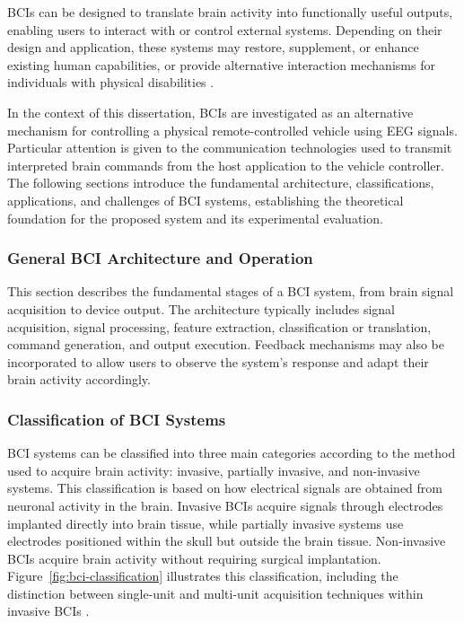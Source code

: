 BCIs can be designed to translate brain activity into functionally useful outputs, enabling users to interact with or control external systems. Depending on their design and application, these systems may restore, supplement, or enhance existing human capabilities, or provide alternative interaction mechanisms for individuals with physical disabilities .

In the context of this dissertation, BCIs are investigated as an alternative mechanism for controlling a physical remote-controlled vehicle using EEG signals. Particular attention is given to the communication technologies used to transmit interpreted brain commands from the host application to the vehicle controller. The following sections introduce the fundamental architecture, classifications, applications, and challenges of BCI systems, establishing the theoretical foundation for the proposed system and its experimental evaluation.

\subsubsection{General BCI Architecture and Operation}

This section describes the fundamental stages of a BCI system, from brain signal acquisition to device output. The architecture typically includes signal acquisition, signal processing, feature extraction, classification or translation, command generation, and output execution. Feedback mechanisms may also be incorporated to allow users to observe the system's response and adapt their brain activity accordingly.

\subsubsection{Classification of BCI Systems}

BCI systems can be classified into three main categories according to the method used to acquire brain activity: invasive, partially invasive, and non-invasive systems. This classification is based on how electrical signals are obtained from neuronal activity in the brain. Invasive BCIs acquire signals through electrodes implanted directly into brain tissue, while partially invasive systems use electrodes positioned within the skull but outside the brain tissue. Non-invasive BCIs acquire brain activity without requiring surgical implantation. Figure~\ref{fig:bci-classification} illustrates this classification, including the distinction between single-unit and multi-unit acquisition techniques within invasive BCIs \cite{hassanien2015}.

